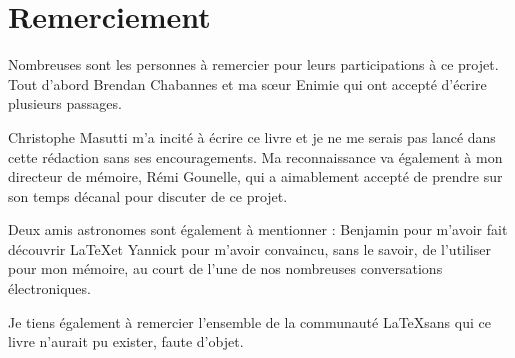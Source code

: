 \section*{Remerciement}

Nombreuses sont les personnes à remercier pour leurs participations à ce projet. Tout d'abord Brendan Chabannes et ma sœur Enimie qui ont accepté d'écrire plusieurs passages.

Christophe Masutti m'a incité à écrire ce livre et je ne me serais pas lancé dans cette rédaction sans ses encouragements. Ma reconnaissance va également à mon directeur de mémoire, Rémi Gounelle, qui a aimablement accepté de prendre sur son temps décanal pour discuter de ce projet.

Deux amis astronomes sont également à mentionner : Benjamin pour m'avoir fait découvrir  \LaTeX et Yannick pour m'avoir convaincu, sans le savoir, de l'utiliser pour mon mémoire, au court de l'une de nos nombreuses conversations électroniques.

Je tiens également à remercier l'ensemble de la communauté \LaTeX sans qui ce livre n'aurait pu exister, faute d'objet.
 

